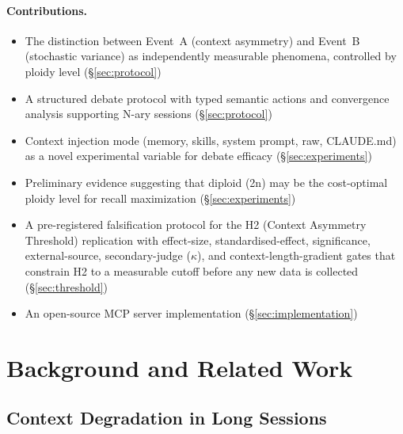 \documentclass[11pt]{article}
\begin{document}
\paragraph{Contributions.}
\begin{itemize}[leftmargin=1.5em]
  \item The distinction between Event~A (context asymmetry) and Event~B (stochastic variance) as independently measurable phenomena, controlled by ploidy level (\S\ref{sec:protocol})
  \item A structured debate protocol with typed semantic actions and convergence analysis supporting N-ary sessions (\S\ref{sec:protocol})
  \item Context injection mode (memory, skills, system prompt, raw, CLAUDE.md) as a novel experimental variable for debate efficacy (\S\ref{sec:experiments})
  \item Preliminary evidence suggesting that diploid (2n) may be the cost-optimal ploidy level for recall maximization (\S\ref{sec:experiments})
  \item A pre-registered falsification protocol for the H2 (Context Asymmetry Threshold) replication with effect-size, standardised-effect, significance, external-source, secondary-judge ($\kappa$), and context-length-gradient gates that constrain H2 to a measurable cutoff before any new data is collected (\S\ref{sec:threshold})
  \item An open-source MCP server implementation (\S\ref{sec:implementation})
\end{itemize}

\section{Background and Related Work}
\label{sec:related}

\subsection{Context Degradation in Long Sessions}
\label{sec:context-degradation}
\end{document}
